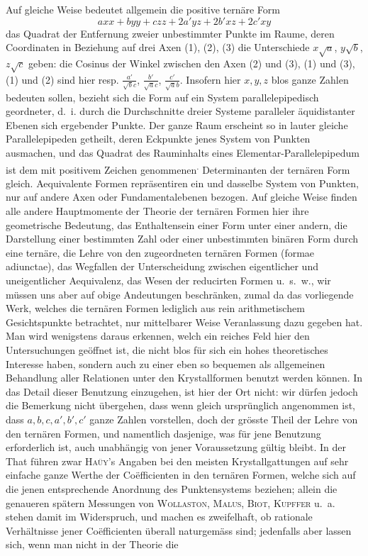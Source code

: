 Auf gleiche Weise bedeutet allgemein die positive ternäre Form
\[
axx+byy+czz+2a'yz+2b'xz+2c'xy
\]
das Quadrat der Entfernung zweier unbestimmter Punkte im Raume, deren Coordinaten in Beziehung auf drei Axen (1), (2), (3) die Unterschiede $x\surd a$, $y\surd b$, $z\surd c$
%
geben: die Cosinus der Winkel zwischen den Axen (2) und (3), (1) und (3), (1) und (2) sind hier resp. $\frac{a'}{\surd bc}$, $\frac{b'}{\surd ac}$, $\frac{c'}{\surd ab}$. Insofern hier $x,y,z$ blos ganze Zahlen bedeuten sollen, bezieht sich die Form auf ein System parallelepipedisch geordneter, d.~i. durch die Durchschnitte dreier Systeme paralleler äquidistanter Ebenen sich ergebender Punkte. Der ganze Raum erscheint so in lauter gleiche Parallelepipeden getheilt, deren Eckpunkte jenes System von Punkten ausmachen, und das Quadrat des Rauminhalts eines Elementar-Parallelepipedum ist dem mit positivem Zeichen genommenen\textsuperscript{.} Determinanten der ternären Form gleich. Aequivalente Formen repräsentiren ein und dasselbe System von Punkten, nur auf andere Axen oder Fundamentalebenen bezogen. Auf gleiche Weise finden alle andere Hauptmomente der Theorie der ternären Formen hier ihre geometrische Bedeutung, das Enthaltensein einer Form unter einer andern, die Darstellung einer bestimmten Zahl oder einer unbestimmten binären Form durch eine ternäre, die Lehre von den zugeordneten ternären Formen (formae adiunctae), das Wegfallen der Unterscheidung zwischen eigentlicher und uneigentlicher Aequivalenz, das Wesen der reducirten Formen u.~s.~w., wir müssen uns aber auf obige Andeutungen beschränken, zumal da das vorliegende Werk, welches die ternären Formen lediglich aus rein arithmetischem Gesichtspunkte betrachtet, nur mittelbarer Weise Veranlassung dazu gegeben hat. Man wird wenigstens daraus erkennen, welch ein reiches Feld hier den Untersuchungen geöffnet ist, die nicht blos für sich ein hohes theoretisches Interesse haben, sondern auch zu einer eben so bequemen als allgemeinen Behandlung aller Relationen unter den Krystallformen benutzt werden können. In das Detail dieser Benutzung einzugehen, ist hier der Ort nicht: wir dürfen jedoch die Bemerkung nicht übergehen, dass wenn gleich ursprünglich angenommen ist, dass $a,b,c,a',b',c'$ ganze Zahlen vorstellen, doch der grösste Theil der Lehre von den ternären Formen, und namentlich dasjenige, was für jene Benutzung erforderlich ist, auch unabhängig von jener Voraussetzung gültig bleibt. In der That führen zwar \textsc{Haüy}'s Angaben bei den meisten Krystallgattungen auf sehr einfache ganze Werthe der Coëfficienten in den ternären Formen, welche sich auf die jenen entsprechende Anordnung des Punktensystems beziehen; allein die genaueren spätern Messungen von \textsc{Wollaston}, \textsc{Malus}, \textsc{Biot}, \textsc{Kupffer} u.~a. stehen damit im Widerspruch, und machen es zweifelhaft, ob rationale Verhältnisse jener Coëfficienten überall naturgemäss sind; jedenfalls aber lassen sich, wenn man nicht in der Theorie die 
